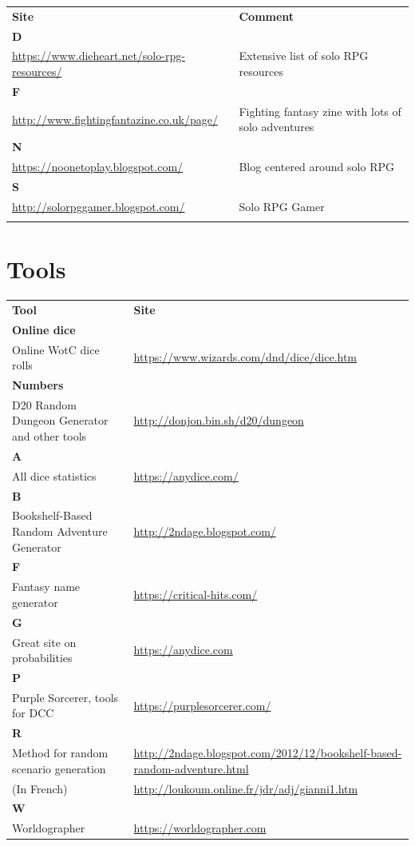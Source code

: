 \documentclass[a4paper, 11pt, twoside]{article}
\begin{document}
\begin{longtable}{p{6cm}p{8cm}}
\textbf{Site} & \textbf{Comment}\\
\textbf{D} & \\
\url{https://www.dieheart.net/solo-rpg-resources/} & Extensive list of solo RPG resources\\
\textbf{F} & \\
\url{http://www.fightingfantazine.co.uk/page/} & Fighting fantasy zine with lots of solo adventures\\
\textbf{N} & \\
\url{https://noonetoplay.blogspot.com/} & Blog centered around solo RPG\\
\textbf{S} & \\
\url{http://solorpggamer.blogspot.com/} & Solo RPG Gamer\\
 & \\
\end{longtable}

\section{Tools}
\label{sec:orgbc407e7}

\begin{longtable}{p{6cm}p{8cm}}
\textbf{Tool} & \textbf{Site}\\
\textbf{Online dice} & \\
Online WotC dice rolls & \url{https://www.wizards.com/dnd/dice/dice.htm}\\
\textbf{Numbers} & \\
D20 Random Dungeon Generator and other tools & \url{http://donjon.bin.sh/d20/dungeon}\\
\textbf{A} & \\
All dice statistics & \url{https://anydice.com/}\\
\textbf{B} & \\
Bookshelf-Based Random Adventure Generator & \href{http://2ndage.blogspot.com/2012/12/bookshelf-based-random-adventure.html}{http://2ndage.blogspot.com/}\\
\textbf{F} & \\
Fantasy name generator & \href{https://critical-hits.com/ch-presents/fantasy-name-generator/}{https://critical-hits.com/}\\
\textbf{G} & \\
Great site on probabilities & \url{https://anydice.com}\\
\textbf{P} & \\
Purple Sorcerer, tools for DCC & \url{https://purplesorcerer.com/}\\
\textbf{R} & \\
Method for random scenario generation & \url{http://2ndage.blogspot.com/2012/12/bookshelf-based-random-adventure.html}\\
(In French) & \url{http://loukoum.online.fr/jdr/adj/gianni1.htm}\\
\textbf{W} & \\
Worldographer & \url{https://worldographer.com}\\
\end{longtable}
\end{document}
